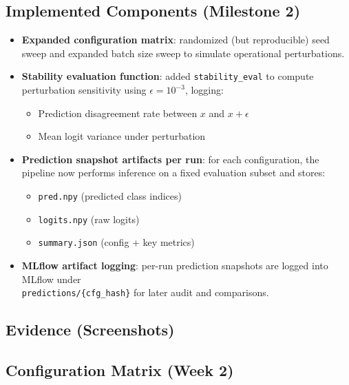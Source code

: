 \documentclass[11pt]{article}
\begin{document}
\subsection*{Implemented Components (Milestone 2)}
\begin{itemize}
  \item \textbf{Expanded configuration matrix}: randomized (but reproducible) seed sweep and expanded batch size sweep to simulate operational perturbations.
  \item \textbf{Stability evaluation function}: added \texttt{stability\_eval} to compute perturbation sensitivity using $\epsilon=10^{-3}$, logging:
    \begin{itemize}
      \item Prediction disagreement rate between $x$ and $x+\epsilon$
      \item Mean logit variance under perturbation
    \end{itemize}
  \item \textbf{Prediction snapshot artifacts per run}: for each configuration, the pipeline now performs inference on a fixed evaluation subset and stores:
    \begin{itemize}
      \item \texttt{pred.npy} (predicted class indices)
      \item \texttt{logits.npy} (raw logits)
      \item \texttt{summary.json} (config + key metrics)
    \end{itemize}
  \item \textbf{MLflow artifact logging}: per-run prediction snapshots are logged into MLflow under \\\texttt{predictions/\{cfg\_hash\}} for later audit and comparisons.
\end{itemize}

\subsection*{Evidence (Screenshots)}

\subsection*{Configuration Matrix (Week 2)}
\end{document}
